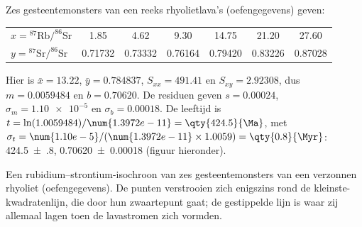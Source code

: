 \begin{example}\label{ex:b1:radiometric-methods:rhyolite}
Zes gesteentemonsters van een reeks rhyolietlava's (oefengegevens) geven:
\begin{center}
\small
\begin{tabular}{|l|cccccc|}
\hline
$x = {}^{87}\mathrm{Rb}/^{86}\mathrm{Sr}$ & 1.85 & 4.62 & 9.30 & 14.75 & 21.20 & 27.60 \\
$y = {}^{87}\mathrm{Sr}/^{86}\mathrm{Sr}$ & 0.71732 & 0.73332 & 0.76164 & 0.79420 & 0.83226 & 0.87028 \\
\hline
\end{tabular}
\end{center}
Hier is $\bar x = 13.22$, $\bar y = 0.784837$, $S_{xx} = 491.41$ en
$S_{xy} = 2.92308$, dus $m = 0.0059484$ en $b = 0.70620$. De residuen geven
$s = 0.00024$, $\sigma_m = \num{1.10e-5}$ en $\sigma_b = 0.00018$. De leeftijd is
$t = \ln(1.0059484)/\num{1.3972e-11} = \qty{424.5}{\Ma}$, met
$\sigma_t = \num{1.10e-5}/(\num{1.3972e-11} \times 1.0059) = \qty{0.8}{\Myr}$:
\qty[uncertainty-mode=separate]{424.5(8)}{\Ma}, 
\num[uncertainty-mode=separate]{0.70620(18)} (figuur hieronder).
\end{example}

\begin{omfigure}

{\small Een rubidium--strontium-isochroon van zes gesteentemonsters van een verzonnen rhyoliet (oefengegevens). De punten verstrooien zich enigszins rond de kleinste-kwadratenlijn, die door hun zwaartepunt gaat; de gestippelde lijn is waar zij allemaal lagen toen de lavastromen zich vormden.}
\label{fig:b1:radiometric-methods:isochron}
\end{omfigure}

